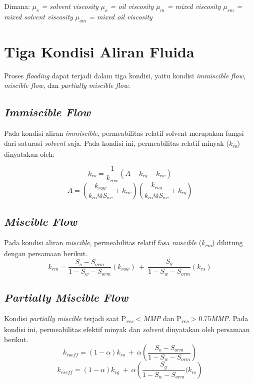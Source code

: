 \documentclass[
]{book}
\begin{document}
Dimana:
\emph{\(\mu_s\) = solvent viscosity}
\emph{\(\mu_o\) = oil viscosity}
\emph{\(\mu_m\) = mixed viscosity}
\emph{\(\mu_{sm}\) = mixed solvent viscosity}
\emph{\(\mu_{om}\) = mixed oil viscosity}

\hypertarget{tiga-kondisi-aliran-fluida}{%
\section{Tiga Kondisi Aliran Fluida}\label{tiga-kondisi-aliran-fluida}}

Proses \emph{flooding} dapat terjadi dalam tiga kondisi, yaitu kondisi \emph{immiscible flow}, \emph{miscible flow}, dan \emph{partially miscible flow}.

\hypertarget{immiscible-flow}{%
\subsection{\texorpdfstring{\emph{Immiscible Flow}}{Immiscible Flow}}\label{immiscible-flow}}

Pada kondisi aliran \emph{immiscible}, permeabilitas relatif solvent merupakan fungsi dari saturasi \emph{solvent} saja. Pada kondisi ini, permeabilitas relatif minyak (\emph{k}\textsubscript{\emph{ro}}) dinyatakan oleh:

\[k_{ro} = \frac{1}{k_{row}}(A-k_{rg}-k_{rw})\]
\[A = \left( \frac{k_{row}}{k_{ro}@S_{wc}}+k_{rw}\right)\left( \frac{k_{rog}}{k_{ro}@S_{wc}}+k_{rg}\right) \]

\hypertarget{miscible-flow}{%
\subsection{\texorpdfstring{\emph{Miscible Flow}}{Miscible Flow}}\label{miscible-flow}}

Pada kondisi aliran \emph{miscible}, permeabilitas relatif fasa \emph{miscible} (\emph{k}\textsubscript{\emph{rm}}) dihitung dengan persamaan berikut.
\[k_{rm} = \frac{S_o-S_{orm}}{1-S_w-S_{orm}}(k_{row})\ +\ \frac{S_g}{1-S_w-S_{orm}}(k_{rs}) \]

\hypertarget{partially-miscible-flow}{%
\subsection{\texorpdfstring{\emph{Partially Miscible Flow}}{Partially Miscible Flow}}\label{partially-miscible-flow}}

Kondisi \emph{partially miscible} terjadi saat P\textsubscript{\emph{res}} \textless{} \emph{MMP} dan P\textsubscript{\emph{res}} \textgreater{} 0.75\emph{MMP}. Pada kondisi ini, permeabilitas efektif minyak dan \emph{solvent} dinyatakan oleh persamaan berikut.
\[k_{roeff} = (1-\alpha)k_{ro}\ +\ \alpha \left( \frac{S_o-S_{orm}}{1-S_w-S_{orm}} \right)\]
\[k_{rseff} = (1-\alpha)k_{rg}\ +\ \alpha \left( \frac{S_g}{1-S_w-S_{orm}}(k_{rs} \right)\]
\end{document}
